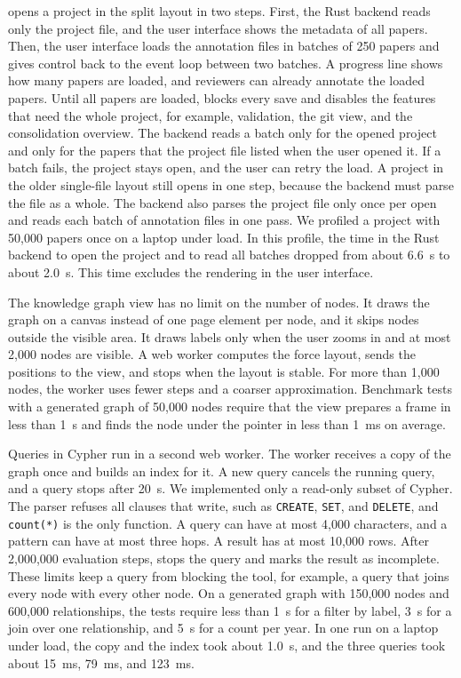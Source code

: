 \SaiLoR opens a project in the split layout in two steps.
First, the Rust backend reads only the project file, and the user interface shows the metadata of all papers.
Then, the user interface loads the annotation files in batches of 250 papers and gives control back to the event loop between two batches.
A progress line shows how many papers are loaded, and reviewers can already annotate the loaded papers.
Until all papers are loaded, \SaiLoR blocks every save and disables the features that need the whole project, for example, validation, the git view, and the consolidation overview.
The backend reads a batch only for the opened project and only for the papers that the project file listed when the user opened it.
If a batch fails, the project stays open, and the user can retry the load.
A project in the older single-file layout still opens in one step, because the backend must parse the file as a whole.
The backend also parses the project file only once per open and reads each batch of annotation files in one pass.
We profiled a project with 50,000 papers once on a laptop under load.
In this profile, the time in the Rust backend to open the project and to read all batches dropped from about 6.6~s to about 2.0~s.
This time excludes the rendering in the user interface.

The knowledge graph view has no limit on the number of nodes.
It draws the graph on a canvas instead of one page element per node, and it skips nodes outside the visible area.
It draws labels only when the user zooms in and at most 2,000 nodes are visible.
A web worker computes the force layout, sends the positions to the view, and stops when the layout is stable.
For more than 1,000 nodes, the worker uses fewer steps and a coarser approximation.
Benchmark tests with a generated graph of 50,000 nodes require that the view prepares a frame in less than 1~s and finds the node under the pointer in less than 1~ms on average.

Queries in Cypher run in a second web worker.
The worker receives a copy of the graph once and builds an index for it.
A new query cancels the running query, and a query stops after 20~s.
We implemented only a read-only subset of Cypher.
The parser refuses all clauses that write, such as \texttt{CREATE}, \texttt{SET}, and \texttt{DELETE}, and \texttt{count(*)} is the only function.
A query can have at most 4,000 characters, and a pattern can have at most three hops.
A result has at most 10,000 rows.
After 2,000,000 evaluation steps, \SaiLoR stops the query and marks the result as incomplete.
These limits keep a query from blocking the tool, for example, a query that joins every node with every other node.
On a generated graph with 150,000 nodes and 600,000 relationships, the tests require less than 1~s for a filter by label, 3~s for a join over one relationship, and 5~s for a count per year.
In one run on a laptop under load, the copy and the index took about 1.0~s, and the three queries took about 15~ms, 79~ms, and 123~ms.

